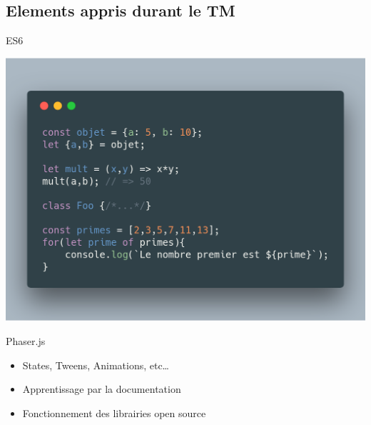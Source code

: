 \documentclass[11pt]{beamer}
\newcommand{\pauseditemize}{\pause \begin{itemize}[<+->]}
\begin{document}
\subsection{Elements appris durant le TM}

\begin{frame}{ES6}

\begin{center}
	\includegraphics[scale=.2]{../images/es6}
\end{center}

\end{frame}

\begin{frame}{Phaser.js}

\pauseditemize
	\item States, Tweens, Animations, etc\dots
	\item Apprentissage par la documentation
	\item Fonctionnement des librairies open source
\end{itemize}

\end{frame}

	

\end{document}
